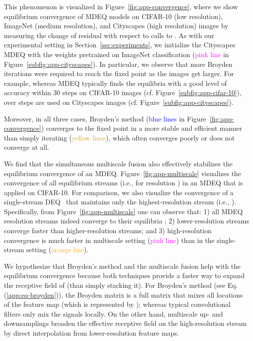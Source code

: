 \documentclass{article}
\begin{document}
This phenomenon is visualized in Figure~\ref{fig:app-convergence}, where we show equilibrium convergence of MDEQ models on CIFAR-10 (low resolution), ImageNet (medium resolution), and Cityscapes (high resolution) images by measuring the change of residual  with respect to calls to . As with our experimental setting in Section~\ref{sec:experiments}, we initialize the Cityscapes MDEQ with the weights pretrained on ImageNet classification (\textcolor{Magenta}{pink line} in Figure~\ref{subfig:app-cityscapes}). In particular, we observe that more Broyden iterations were required to reach the fixed point as the images get larger. For example, whereas MDEQ typically finds the equilibria with a good level of accuracy within 30 steps on CIFAR-10 images (cf. Figure~\ref{subfig:app-cifar-10}), over  steps are used on Cityscapes images (cf. Figure~\ref{subfig:app-cityscapes}).

Moreover, in all three cases, Broyden's method (\textcolor{blue}{blue lines} in Figure~\ref{fig:app-convergence}) converges to the fixed point in a more  stable and efficient manner than simply iterating  (\textcolor{Goldenrod}{yellow lines}), which often converges poorly or does not converge at all.

\vspace{.05in}
We find that the simultaneous multiscale fusion also effectively stabilizes the equilibrium convergence of an MDEQ. Figure~\ref{fig:app-multiscale} visualizes the convergence of all equilibrium streams (i.e.,  for resolution ) in an MDEQ that is applied on CIFAR-10. For comparison, we also visualize the convergence of a single-stream DEQ~\cite{bai2019deep} that maintains only the highest-resolution stream (i.e., ). Specifically, from Figure~\ref{fig:app-multiscale} one can observe that: 1) all MDEQ resolution streams indeed converge to their equilibria ; 2) lower-resolution streams converge faster than higher-resolution streams; and 3) high-resolution convergence is much faster in multiscale setting (\textcolor{Magenta}{pink line}) than in the single-stream setting (\textcolor{orange}{orange line}).

We hypothesize that Broyden's method and the multiscale fusion help with the equilibrium convergence because both techniques provide a faster way to expand the receptive field of  (than simply stacking it). For Broyden's method (see Eq. (\ref{app:eq-broyden})), the Broyden matrix  is a full matrix that mixes all locations of the feature map (which is represented by ); whereas typical convolutional filters only mix the signals locally. On the other hand, multiscale up- and downsamplings broaden the effective receptive field on the high-resolution stream by direct interpolation from lower-resolution feature maps.
\end{document}
